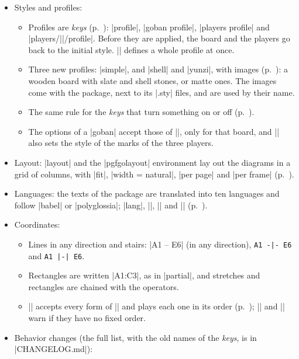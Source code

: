\begin{itemize}
\begin{itemize}
\begin{itemize}
					\item The \tikzname\ coordinate system |go|: |(go cs:C3)| (p.~\pageref{subsec:tikz}).
				\end{itemize}
			\item Styles and profiles:
				\begin{itemize}
					\item Profiles are \emph{keys} (p.~\pageref{subsec:perfiles}): |profile|, |goban profile|, |players profile| and |players/||/profile|. Before they are applied, the board and the players go back to the initial style. |\pgfgodefineprofile| defines a whole profile at once.
					\item Three new profiles: |simple|, and |shell| and |yunzi|, with images (p.~\pageref{subsec:perfilshell}): a wooden board with slate and shell stones, or matte ones. The images come with the package, next to its |.sty| files, and are used by their name.
					\item The same rule for the \emph{keys} that turn something on or off (p.~\pageref{subsec:prender}).
					\item The options of a |goban| accept those of |\pgfgoset|, only for that board, and || also sets the style of the marks of the three players.
				\end{itemize}
			\item Layout: |layout| and the |pgfgolayout| environment lay out the diagrams in a grid of columns, with |fit|, |width = natural|, |per page| and |per frame| (p.~\pageref{subsec:disposicion}).
			\item Languages: the texts of the package are translated into ten languages and follow |babel| or |polyglossia|; |lang|, |\pgfgotext|, |\pgfgodefinelanguage| and |\pgfgolanguagealias| (p.~\pageref{subsec:idiomas}).
			\item Coordinates:
				\begin{itemize}
					\item Lines in any direction and stairs: |A1 -- E6| (in any direction), \verb+A1 -|- E6+ and \verb+A1 |-| E6+.
					\item Rectangles are written |A1:C3|, as in |partial|, and stretches and rectangles are chained with the operators.
					\item |\moves| accepts every form of |\stones| and plays each one in its order (p.~\pageref{subsec:orden-coordenadas}); |\moves| and |\marks[sequence]| warn if they have no fixed order.
				\end{itemize}
			\item Behavior changes (the full list, with the old names of the \emph{keys}, is in |CHANGELOG.md|):

\end{itemize}
\end{itemize}
